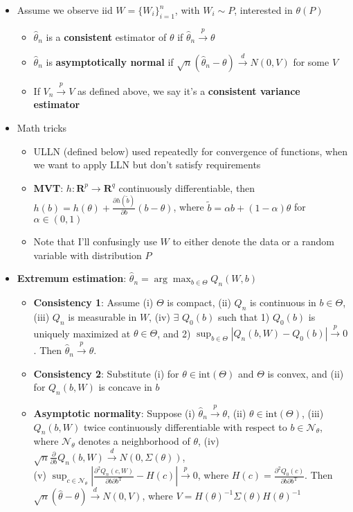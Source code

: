 \documentclass[12pt,english]{article}
\newcommand{\T}{\ensuremath{\text{T}}}
\begin{document}
\begin{itemize}
	\item Assume we observe iid $W = \{ W_{i} \}_{i=1}^{n}$, with $W_{i} \sim P$, interested in $\theta(P)$
	\begin{itemize}
		\item $\hat{\theta}_{n}$ is a \textbf{consistent} estimator of $\theta$ if $\hat{\theta}_{n} \overset{p}{\to} \theta$
		\item $\hat{\theta}_{n}$ is \textbf{asymptotically normal} if $\sqrt{n} (\hat{\theta}_{n} - \theta) \overset{d}{\to} N(0, V)$ for some $V$
		\item If $V_{n} \overset{p}{\to} V$ as defined above, we say it's a \textbf{consistent variance estimator}
	\end{itemize}
	\item Math tricks
	\begin{itemize}
		\item ULLN (defined below) used repeatedly for convergence of functions, when we want to apply LLN but don't satisfy requirements
		\item \textbf{MVT}: $h : \mathbf{R}^{p} \to \mathbf{R}^{q}$ continuously differentiable, then $h(b) = h(\theta) + \frac{\partial h(\tilde{b})}{\partial b} (b - \theta)$, where $\tilde{b} = \alpha b + (1 - \alpha) \theta$ for $\alpha \in (0, 1)$
		\item Note that I'll confusingly use $W$ to either denote the data or a random variable with distribution $P$
	\end{itemize}
	\item \textbf{Extremum estimation}: $\hat{\theta}_{n} = \arg \max_{b \in \Theta} Q_{n}(W, b)$
	\begin{itemize}
		\item \textbf{Consistency 1}: Assume (i) $\Theta$ is compact, (ii) $Q_{n}$ is continuous in $b \in \Theta$, (iii) $Q_{n}$ is measurable in $W$, (iv) $\exists$ $Q_{0}(b)$ such that 1) $Q_{0}(b)$ is uniquely maximized at $\theta \in \Theta$, and 2) $\sup_{b \in \Theta} | Q_{n}(b, W) - Q_{0}(b) | \overset{p}{\to} 0$. Then $\hat{\theta}_{n} \overset{p}{\to} \theta$.
		\item \textbf{Consistency 2}: Substitute (i) for $\theta \in \text{int}(\Theta)$ and $\Theta$ is convex, and (ii) for $Q_{n}(b, W)$ is concave in $b$
		\item \textbf{Asymptotic normality}: Suppose (i) $\hat{\theta}_{n} \overset{p}{\to} \theta$, (ii) $\theta \in \text{int}(\Theta)$, (iii) $Q_{n}(b, W)$ twice continuously differentiable with respect to $b \in \mathcal{N}_{\theta}$, where $\mathcal{N}_{\theta}$ denotes a neighborhood of $\theta$, (iv) $\sqrt{n} \frac{\partial}{\partial b} Q_{n}(b, W) \overset{d}{\to} N(0, \Sigma(\theta))$, \\(v) $\sup_{c \in \mathcal{N}_{\theta}} \left| \frac{\partial^{2} Q_{n}(c, W)}{\partial b \partial b^{\T}} - H(c) \right| \overset{p}{\to} 0$, where $H(c) = \frac{\partial^{2} Q_{0}(c)}{\partial b \partial b^{\T}}$. Then $\sqrt{n}(\hat{\theta} - \theta) \overset{d}{\to} N(0, V)$, where $V = H(\theta)^{-1} \Sigma(\theta) H(\theta)^{-1}$ 

\end{itemize}
\end{itemize}
\end{document}
